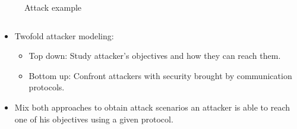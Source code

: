 \documentclass{beamer}
\begin{document}
\begin{frame}[fragile]{}
\begin{tcolorbox}[adjusted title={\centering\large Smart-Fuzzing of Industrial Systems}]
\begin{columns}[T]
\begin{column}{.65\textwidth}
\begin{tcolorbox}
\begin{columns}[T]
\begin{column}{.5\textwidth}
\begin{figure}[htb]
{                                    
                                }
                                \vspace{-.5em}
                                \caption{Attack example}
                            \end{figure}
                        \end{column}
                    \end{columns}
                \end{tcolorbox}
            \end{column}
        \end{columns}
    \end{tcolorbox}
    \vspace{.25em}
    \begin{tcolorbox}[adjusted title={\centering\large Attack models}]
        \vspace{.5em}
        \begin{columns}[T]
            \begin{column}{.35\textwidth}
                \begin{tcolorbox}[
                colback=white, %
                colframe=normalTitleBlockColor, %
                colframe=gray!20, %
                boxrule=1mm,
                coltext=black, %
                coltitle=black, %
                bottom=2mm,
                equal height group=D,
                valign = center,
                adjusted title={\large Objectives}]
                    \vspace{.5em}
                    \begin{itemize}
                        \item Twofold attacker modeling:
                        \begin{itemize}
                            \item Top down: Study attacker's objectives and how they can reach them.
                            \item Bottom up: Confront attackers with security brought by communication protocols.
                        \end{itemize}
                        \vspace{.5em}
                        \item Mix both approaches to obtain attack scenarios an attacker is able to reach one of his objectives using a given protocol.

\end{itemize}
\end{tcolorbox}
\end{column}
\end{columns}
\end{tcolorbox}
\end{frame}
\end{document}
